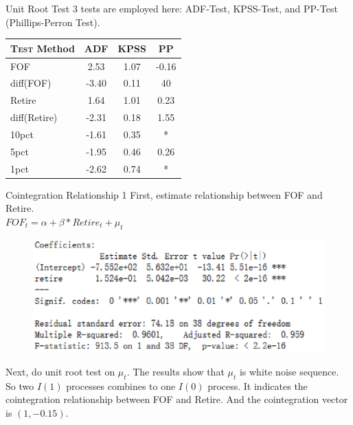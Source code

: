 \documentclass{beamer}
\begin{document}
\begin{frame}{Unit Root Test}
	3 tests are employed here: ADF-Test, KPSS-Test, and PP-Test (Phillips-Perron Test). \\
	\begin{tabular}{|l| c| c| c|}
	\hline
	\textsc{Test} Method &  ADF   & KPSS &  PP   \\ \hline
	FOF 				 &  2.53  & 1.07 & -0.16 \\ \hline
	diff(FOF) 			 & -3.40  & 0.11 & 40 	 \\ \hline
	Retire 				 &  1.64  & 1.01 & 0.23  \\ \hline
	diff(Retire) 		 & -2.31  & 0.18 & 1.55  \\ \hline
	10pct 				 & -1.61  & 0.35 &   * 	 \\ \hline
	5pct 				 & -1.95  & 0.46 & 0.26  \\ \hline
	1pct 				 & -2.62  & 0.74 &   * \\ \hline

	\end{tabular}

\end{frame}


\begin{frame}{Cointegration Relationship 1}
	First, estimate relationship between FOF and Retire.\\
	$FOF_t = \alpha + \beta * Retire_t + \mu_t$
	\begin{center}
	\begin{figure}
		\includegraphics[scale=0.4]{3-3.eps}
	\end{figure}
	\end{center}

	Next, do unit root test on $\mu_t$. The results show that $\mu_t$ is white noise sequence. So two $I(1)$ processes combines to one $I(0)$ process. It indicates the cointegration relationship between FOF and Retire. And the cointegration vector is $(1, -0.15)$.
\end{frame}
\end{document}
